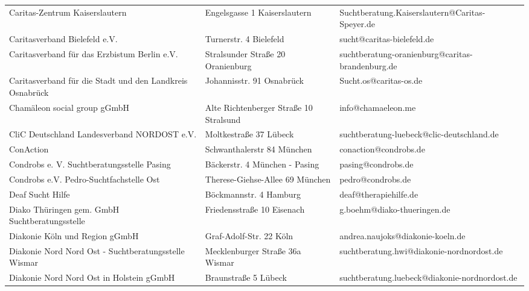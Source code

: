 {\begin{xltabular}{\textwidth} {
 >{\raggedright\arraybackslash}p{5cm}
 >{\raggedright\arraybackslash}X
 >{\raggedright\arraybackslash}p{5cm} }
Caritas-Zentrum Kaiserslautern & Engelsgasse 1 Kaiserslautern & Suchtberatung.Kaiserslautern@Caritas-Speyer.de \\
Caritasverband Bielefeld e.V. & Turnerstr. 4 Bielefeld & sucht@caritas-bielefeld.de \\
Caritasverband für das Erzbistum Berlin e.V. & Stralsunder Straße 20 Oranienburg & suchtberatung-oranienburg@caritas-brandenburg.de \\
Caritasverband für die Stadt und den Landkreis Osnabrück & Johannisstr. 91 Osnabrück & Sucht.os@caritas-os.de \\
Chamäleon social group gGmbH & Alte Richtenberger Straße 10 Stralsund & info@chamaeleon.me \\
CliC Deutschland Landesverband NORDOST e.V. & Moltkestraße 37 Lübeck & suchtberatung-luebeck@clic-deutschland.de \\
ConAction & Schwanthalerstr 84 München & conaction@condrobs.de \\
Condrobs e. V. Suchtberatungsstelle Pasing & Bäckerstr. 4 München - Pasing & pasing@condrobs.de \\
Condrobs e.V. Pedro-Suchtfachstelle Ost & Therese-Giehse-Allee 69 München & pedro@condrobs.de \\
Deaf Sucht Hilfe & Böckmannstr. 4 Hamburg & deaf@therapiehilfe.de \\
Diako Thüringen gem. GmbH Suchtberatungsstelle & Friedensstraße 10 Eisenach & g.boehm@diako-thueringen.de \\
Diakonie Köln und Region gGmbH & Graf-Adolf-Str. 22 Köln & andrea.naujoks@diakonie-koeln.de \\
Diakonie Nord Nord Ost - Suchtberatungsstelle Wismar & Mecklenburger Straße 36a Wismar & suchtberatung.hwi@diakonie-nordnordost.de \\
Diakonie Nord Nord Ost in Holstein gGmbH & Braunstraße 5 Lübeck & suchtberatung.luebeck@diakonie-nordnordost.de \\

\end{xltabular}}
